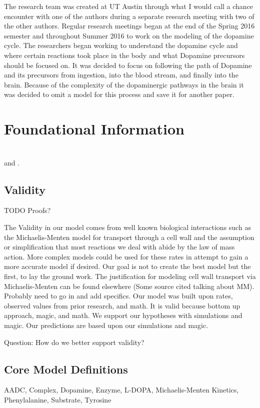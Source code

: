 \documentclass[smallextended]{svjour3}
\newcommand{\todo}[1]{{\huge\color{red}TODO {#1}}}
\newcommand{\Query}[1]{{\huge\color{green}Question: {#1}}}
\begin{document}
The research team was created at UT Austin through what I would call a chance encounter with one of the authors during a separate research meeting with two of the other authors. Regular research meetings began at the end of the Spring 2016 semester and throughout Summer 2016 to work on the modeling of the dopamine cycle. The researchers began working to understand the dopamine cycle and where certain reactions took place in the body and what Dopamine precursors should be focused on. It was decided to focus on following the path of Dopamine and its precursors from ingestion, into the blood stream, and finally into the brain. Because of the complexity of the dopaminergic pathways in the brain it was decided to omit a model for this process and save it for another paper. 
\section{Foundational Information}
\label{sec:2}
\hfill
\\
\cite{Ref24} \cite{Ref25} \cite{Ref17} \cite{Ref2} and \cite{Ref1}.
\subsection{Validity}
\todo{Proofs?}

The Validity in our model comes from well known biological interactions such as the Michaelis-Menten model for transport through a cell wall and the assumption or simplification that most reactions we deal with abide by the law of mass action. More complex models could be used for these rates in attempt to gain a more accurate model if desired. Our goal is not to create the best model but the first, to lay the ground work. The justification for modeling cell wall transport via Michaelis-Menten can be found elsewhere (Some source cited talking about MM). 
Probably need to go in and add specifics.
Our model was built upon rates, observed values from prior research, and math.  It is valid because bottom up approach, magic, and math.  We support our hypotheses with simulations and magic.  Our predictions are based upon our simulations and magic.

\Query{How do we better support validity?}                         %
\subsection{Core Model Definitions}
AADC,
Complex,
Dopamine,
Enzyme,
L-DOPA,
Michaelis-Menten Kinetics,
Phenylalanine,
Substrate,
Tyrosine
\end{document}
